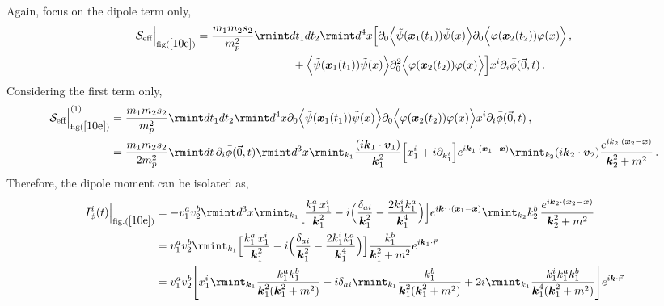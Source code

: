 Again, focus on the dipole term only,
\begin{align}
    \begin{split}
    \mathcal{S}_{\text{eff}}\Big |_{\text{fig}(\ref{10e})}&=\frac{m_1m_2s_2}{m_p^2}\rmint dt_1 dt_2 \rmint d^4x \Big[\partial_0\Big\langle\tilde\psi(\boldsymbol{x}_1(t_1))\tilde\psi(x)\Big\rangle \partial_0\Big\langle\varphi(\boldsymbol{x}_2(t_2))\varphi(x)\Big\rangle\,,\\ &
    \hspace{3 cm}+\Big\langle\tilde\psi(\boldsymbol{x}_1(t_1))\tilde\psi(x)\Big\rangle \partial_0^2\Big\langle\varphi(\boldsymbol{x}_2(t_2))\varphi(x)\Big\rangle\Big]x^{i}\partial_i\bar\phi(\vec 0,t)\,.
    \end{split}
\end{align}
Considering the first term only,
\begin{align}
    \begin{split}
         \mathcal{S}_{\text{eff}}\Big |_{\text{fig}(\ref{10e})}^{(1)}&=\frac{m_1m_2s_2}{m_p^2}\rmint dt_1 dt_2 \rmint d^4x \partial_0\Big\langle\tilde\psi(\boldsymbol{x}_1(t_1))\tilde\psi(x)\Big\rangle \partial_0\Big\langle\varphi(\boldsymbol{x}_2(t_2))\varphi(x)\Big\rangle x^{i}\partial_i \bar\phi(\vec 0,t)\,,\\ &
         =\frac{m_1m_2s_2}{2m_p^2}\rmint dt \,\partial_{i}\bar\phi(\vec 0,t) \rmint d^3x \rmint_{k_1}\frac{(i\boldsymbol{k}_1\cdot \boldsymbol{v}_1) }{\boldsymbol{k}_1^2}\Big[x_1^{i}+i\partial_{k_1^i}\Big]e^{i\boldsymbol{k}_1\cdot (\boldsymbol{x}_1-\boldsymbol{x})}\rmint_{k_2}(i\boldsymbol{k}_2\cdot \boldsymbol{v}_2)\frac{e^{ik_2\cdot (\boldsymbol{x}_2-\boldsymbol{x})}}{\boldsymbol{k}_2^2+m^2}\,.
    \end{split}
\end{align}
Therefore, the dipole moment can be isolated as,
\begin{align}
    \begin{split}
        I_{\phi}^{i}(t)\Big|_{\text{fig.}(\ref{10e})}&=-v_1^a v_2^b\rmint d^3x \rmint_{k_1}\Big[\frac{k_1^a\,x_1^i}{\boldsymbol{k}_1^2} -i\Big(\frac{\delta_{ai}}{\boldsymbol{k}_1^2}-\frac{2k_1^ik_1^a}{\boldsymbol{k}_1^4}\Big)\Big] e^{i\boldsymbol{k}_1\cdot (\boldsymbol{x}_1-\boldsymbol{x})}\rmint_{k_2}k_2^b\,\frac{e^{i\boldsymbol{k}_2\cdot(\boldsymbol{x}_2-\boldsymbol{x})}}{\boldsymbol{k}_2^2+m^2}\\ &
        =v_1^a v_2^b\rmint_{k_1}\Big[\frac{k_1^a\,x_1^i}{\boldsymbol{k}_1^2} -i\Big(\frac{\delta_{ai}}{\boldsymbol{k}_1^2}-\frac{2k_1^ik_1^a}{\boldsymbol{k}_1^4}\Big)\Big]\frac{k_1^b}{\boldsymbol{k}_1^2+m^2}e^{i\boldsymbol{k}_1\cdot \vec r}\\ &
        =v_1^a v_2^b\Bigg[x_1^i\rmint_{\boldsymbol{k}_1}\frac{k_1^a k_1^b}{\boldsymbol{k}_1^2(\boldsymbol{k}_1^2+m^2)}-i\delta_{ai}\rmint_{k_1}\frac{k_1^b}{\boldsymbol{k}_1^2(\boldsymbol{k}_1^2+m^2)}+2i\rmint_{k_1}\frac{k_1^i k_1^a k_1^b}{\boldsymbol{k}_1^4(\boldsymbol{k}_1^2+m^2)}\Bigg]e^{i\boldsymbol{k}\cdot \vec r}
    \end{split}
\end{align}
